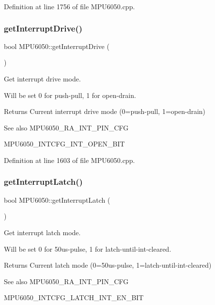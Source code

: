 Definition at line 1756 of file M\+P\+U6050.\+cpp.

\mbox{\label{classMPU6050_af66e6c7b1885dcf452e73371790fddfd}} 
\subsubsection{\texorpdfstring{getInterruptDrive()}{getInterruptDrive()}}
{\footnotesize\ttfamily bool M\+P\+U6050\+::get\+Interrupt\+Drive (\begin{DoxyParamCaption}{ }\end{DoxyParamCaption})}



Get interrupt drive mode. 

Will be set 0 for push-\/pull, 1 for open-\/drain. \begin{DoxyReturn}{Returns}
Current interrupt drive mode (0=push-\/pull, 1=open-\/drain) 
\end{DoxyReturn}
\begin{DoxySeeAlso}{See also}
M\+P\+U6050\+\_\+\+R\+A\+\_\+\+I\+N\+T\+\_\+\+P\+I\+N\+\_\+\+C\+FG 

M\+P\+U6050\+\_\+\+I\+N\+T\+C\+F\+G\+\_\+\+I\+N\+T\+\_\+\+O\+P\+E\+N\+\_\+\+B\+IT 
\end{DoxySeeAlso}


Definition at line 1603 of file M\+P\+U6050.\+cpp.

\mbox{\label{classMPU6050_a5502c4c2a9bc4ea9267e128b7743923d}} 
\subsubsection{\texorpdfstring{getInterruptLatch()}{getInterruptLatch()}}
{\footnotesize\ttfamily bool M\+P\+U6050\+::get\+Interrupt\+Latch (\begin{DoxyParamCaption}{ }\end{DoxyParamCaption})}



Get interrupt latch mode. 

Will be set 0 for 50us-\/pulse, 1 for latch-\/until-\/int-\/cleared. \begin{DoxyReturn}{Returns}
Current latch mode (0=50us-\/pulse, 1=latch-\/until-\/int-\/cleared) 
\end{DoxyReturn}
\begin{DoxySeeAlso}{See also}
M\+P\+U6050\+\_\+\+R\+A\+\_\+\+I\+N\+T\+\_\+\+P\+I\+N\+\_\+\+C\+FG 

M\+P\+U6050\+\_\+\+I\+N\+T\+C\+F\+G\+\_\+\+L\+A\+T\+C\+H\+\_\+\+I\+N\+T\+\_\+\+E\+N\+\_\+\+B\+IT 
\end{DoxySeeAlso}


